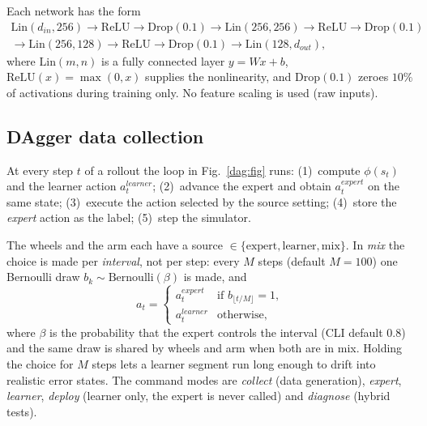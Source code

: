 Each network has the form
\begin{multline*}
  \mathrm{Lin}(d_{in},256)\to\mathrm{ReLU}\to\mathrm{Drop}(0.1)\to\mathrm{Lin}(256,256)\to\mathrm{ReLU}\to\mathrm{Drop}(0.1)\\
  \to\mathrm{Lin}(256,128)\to\mathrm{ReLU}\to\mathrm{Drop}(0.1)\to\mathrm{Lin}(128,d_{out}),
\end{multline*}
where $\mathrm{Lin}(m,n)$ is a fully connected layer $y=Wx+b$, $\mathrm{ReLU}(x)=\max(0,x)$ supplies the nonlinearity, and $\mathrm{Drop}(0.1)$ zeroes $10\%$ of activations during training only. No feature scaling is used (raw inputs).

\subsection{DAgger data collection}
\label{dag:collect}

At every step $t$ of a rollout the loop in Fig.~\ref{dag:fig} runs: (1)~compute $\phi(s_t)$ and the learner action $a_t^{learner}$; (2)~advance the expert and obtain $a_t^{expert}$ on the same state; (3)~execute the action selected by the source setting; (4)~store the \emph{expert} action as the label; (5)~step the simulator.

The wheels and the arm each have a source $\in\{\text{expert},\text{learner},\text{mix}\}$. In \emph{mix} the choice is made per \emph{interval}, not per step: every $M$ steps (default $M=100$) one Bernoulli draw $b_k\sim\mathrm{Bernoulli}(\beta)$ is made, and
\begin{equation}
  a_t=\begin{cases}a_t^{expert}&\text{if }b_{\lfloor t/M\rfloor}=1,\\ a_t^{learner}&\text{otherwise,}\end{cases}
  \label{dag:mix}
\end{equation}
where $\beta$ is the probability that the expert controls the interval (CLI default $0.8$) and the same draw is shared by wheels and arm when both are in mix. Holding the choice for $M$ steps lets a learner segment run long enough to drift into realistic error states. The command modes are \emph{collect} (data generation), \emph{expert}, \emph{learner}, \emph{deploy} (learner only, the expert is never called) and \emph{diagnose} (hybrid tests).

